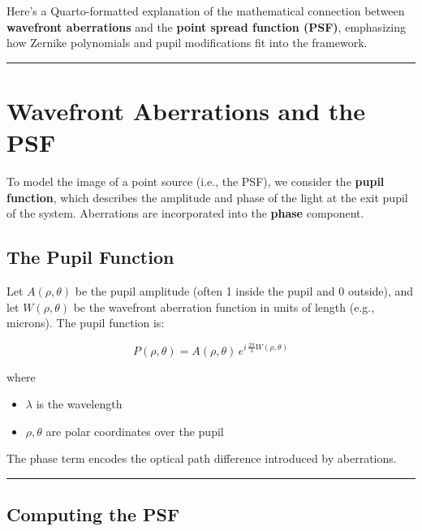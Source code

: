 \documentclass[
  letterpaper,
]{book}
\providecommand{\tightlist}{%
  \setlength{\itemsep}{0pt}\setlength{\parskip}{0pt}}\usepackage{longtable,booktabs,array}
\begin{document}
Here's a Quarto-formatted explanation of the mathematical connection
between \textbf{wavefront aberrations} and the \textbf{point spread
function (PSF)}, emphasizing how Zernike polynomials and pupil
modifications fit into the framework.

\begin{center}\rule{0.5\linewidth}{0.5pt}\end{center}

\section{Wavefront Aberrations and the
PSF}\label{sec-optics-psf-wavefront}

To model the image of a point source (i.e., the PSF), we consider the
\textbf{pupil function}, which describes the amplitude and phase of the
light at the exit pupil of the system. Aberrations are incorporated into
the \textbf{phase} component.

\subsection{The Pupil Function}\label{the-pupil-function}

Let \(A(\rho, \theta)\) be the pupil amplitude (often 1 inside the pupil
and 0 outside), and let \(W(\rho, \theta)\) be the wavefront aberration
function in units of length (e.g., microns). The pupil function is:

\[
P(\rho, \theta) = A(\rho, \theta) \, e^{i \, \frac{2\pi}{\lambda} W(\rho, \theta)}
\]

where

\begin{itemize}
\tightlist
\item
  \(\lambda\) is the wavelength
\item
  \(\rho, \theta\) are polar coordinates over the pupil
\end{itemize}

The phase term encodes the optical path difference introduced by
aberrations.

\begin{center}\rule{0.5\linewidth}{0.5pt}\end{center}

\subsection{Computing the PSF}\label{computing-the-psf}
\end{document}
